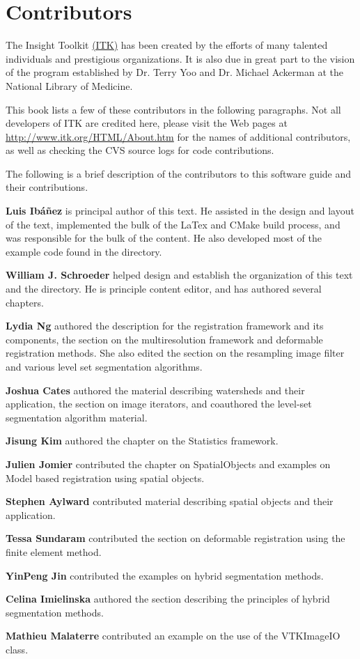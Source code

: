 \chapter*{Contributors}
\noindent

The Insight Toolkit \href{http://www.itk.org}{(ITK)} has been created by the
efforts of many talented individuals and prestigious organizations. It is also
due in great part to the vision of the program established by Dr. Terry Yoo
and Dr. Michael Ackerman at the National Library of Medicine.

This book lists a few of these contributors in the following paragraphs. Not
all developers of ITK are credited here, please visit the Web pages at
\href{http://www.itk.org/HTML/About.htm}{http://www.itk.org/HTML/About.htm} 
for the names of additional contributors, as well as checking the CVS source
logs for code contributions.

The following is a brief description of the contributors to this software
guide and their contributions.

{\bf Luis Ib\'{a}\~{n}ez} is principal author of this text.
He assisted in the design and layout of the text, implemented the bulk of
the LaTex and CMake build process, and was responsible for the bulk of 
the content. He also developed most of the example code found in the
 directory.

{\bf William J. Schroeder} helped design and establish the organization 
of this text and the  directory. He is principle 
content editor, and has authored several chapters.

{\bf Lydia Ng} authored the description for the registration framework and
its components, the section on the multiresolution framework and deformable
registration methods. She also edited the section on the resampling image
filter and various level set segmentation algorithms.

{\bf Joshua Cates} authored the material describing watersheds and their
application, the section on image iterators, and coauthored the level-set 
segmentation algorithm material.

{\bf Jisung Kim} authored the chapter on the Statistics framework.

{\bf Julien Jomier} contributed the chapter on SpatialObjects and examples on
Model based registration using spatial objects.

{\bf Stephen Aylward}  contributed material describing spatial objects and
their application.

{\bf Tessa Sundaram} contributed the section on deformable registration using
the finite element method.

{\bf YinPeng Jin} contributed the examples on  hybrid segmentation methods. 

{\bf Celina Imielinska} authored the section describing the principles of
hybrid segmentation methods.

{\bf Mathieu Malaterre} contributed an example on the use of the VTKImageIO class.



